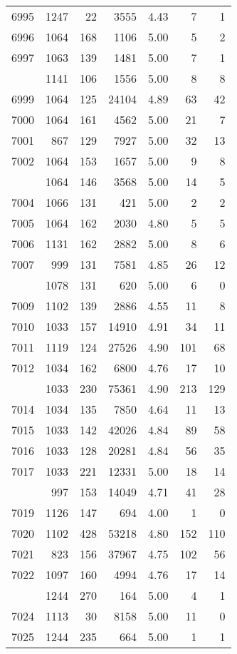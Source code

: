 \documentclass[
]{article}
\begin{document}
\begin{table}
\begin{tabular}[t]{lrrrrrr}
6995 & 1247 & 22 & 3555 & 4.43 & 7 & 1\\
6996 & 1064 & 168 & 1106 & 5.00 & 5 & 2\\
6997 & 1063 & 139 & 1481 & 5.00 & 7 & 1\\
\addlinespace
6998 & 1141 & 106 & 1556 & 5.00 & 8 & 8\\
6999 & 1064 & 125 & 24104 & 4.89 & 63 & 42\\
7000 & 1064 & 161 & 4562 & 5.00 & 21 & 7\\
7001 & 867 & 129 & 7927 & 5.00 & 32 & 13\\
7002 & 1064 & 153 & 1657 & 5.00 & 9 & 8\\
\addlinespace
7003 & 1064 & 146 & 3568 & 5.00 & 14 & 5\\
7004 & 1066 & 131 & 421 & 5.00 & 2 & 2\\
7005 & 1064 & 162 & 2030 & 4.80 & 5 & 5\\
7006 & 1131 & 162 & 2882 & 5.00 & 8 & 6\\
7007 & 999 & 131 & 7581 & 4.85 & 26 & 12\\
\addlinespace
7008 & 1078 & 131 & 620 & 5.00 & 6 & 0\\
7009 & 1102 & 139 & 2886 & 4.55 & 11 & 8\\
7010 & 1033 & 157 & 14910 & 4.91 & 34 & 11\\
7011 & 1119 & 124 & 27526 & 4.90 & 101 & 68\\
7012 & 1034 & 162 & 6800 & 4.76 & 17 & 10\\
\addlinespace
7013 & 1033 & 230 & 75361 & 4.90 & 213 & 129\\
7014 & 1034 & 135 & 7850 & 4.64 & 11 & 13\\
7015 & 1033 & 142 & 42026 & 4.84 & 89 & 58\\
7016 & 1033 & 128 & 20281 & 4.84 & 56 & 35\\
7017 & 1033 & 221 & 12331 & 5.00 & 18 & 14\\
\addlinespace
7018 & 997 & 153 & 14049 & 4.71 & 41 & 28\\
7019 & 1126 & 147 & 694 & 4.00 & 1 & 0\\
7020 & 1102 & 428 & 53218 & 4.80 & 152 & 110\\
7021 & 823 & 156 & 37967 & 4.75 & 102 & 56\\
7022 & 1097 & 160 & 4994 & 4.76 & 17 & 14\\
\addlinespace
7023 & 1244 & 270 & 164 & 5.00 & 4 & 1\\
7024 & 1113 & 30 & 8158 & 5.00 & 11 & 0\\
7025 & 1244 & 235 & 664 & 5.00 & 1 & 1\\

\end{tabular}
\end{table}
\end{document}
